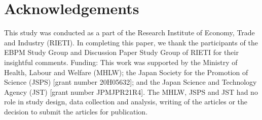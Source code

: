 \documentclass[
  11pt,
  a4paper
]{article}
\begin{document}
\hypertarget{acknowledgements}{%
\section*{Acknowledgements}\label{acknowledgements}}

This study was conducted as a part of the Research Institute of Economy, Trade and Industry (RIETI). In completing this paper, we thank the participants of the EBPM Study Group and Discussion Paper Study Group of RIETI for their insightful comments. Funding: This work was supported by the Ministry of Health, Labour and Welfare (MHLW); the Japan Society for the Promotion of Science (JSPS) {[}grant number 20H05632{]}; and the Japan Science and Technology Agency (JST) {[}grant number JPMJPR21R4{]}. The MHLW, JSPS and JST had no role in study design, data collection and analysis, writing of the articles or the decision to submit the articles for publication.

\clearpage


\end{document}
